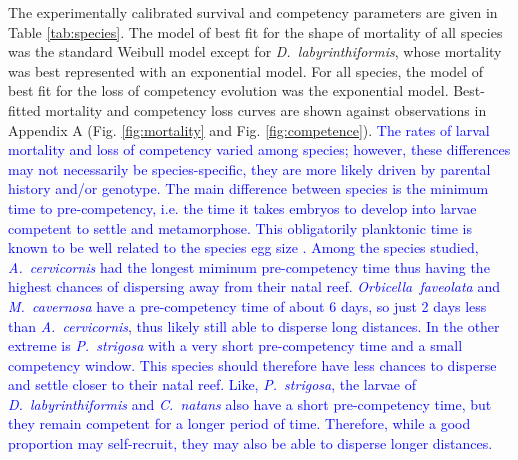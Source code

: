 \documentclass[preprint,12pt,authoryear]{elsarticle}
\newcommand{\modif}[1]{\textcolor{blue}{#1}}
\begin{document}
	The experimentally calibrated survival and competency parameters are given in Table \ref{tab:species}.  The model of best fit for the shape of mortality of all species was the standard Weibull model except for \textit{D.~labyrinthiformis}, whose mortality was best represented with an exponential model. For all species, the model of best fit for the loss of competency evolution was the exponential model. Best-fitted mortality and competency loss curves are shown against observations in Appendix A (Fig. \ref{fig:mortality} and Fig. \ref{fig:competence}). \modif{The rates of larval mortality and loss of competency varied among species; however, these differences may not necessarily be species-specific, they are more likely driven by parental history and/or genotype. The main difference between species is the minimum time to pre-competency, i.e. the time it takes embryos to develop into larvae competent to settle and metamorphose. This obligatorily planktonic time is known to be well related to the species egg size \citep{figueiredo2013synthesizing}. Among the species studied, \textit{A.~cervicornis} had the longest miminum pre-competency time thus having the highest chances of dispersing away from their natal reef. \textit{Orbicella~faveolata} and \textit{M.~cavernosa} have a pre-competency time of about 6 days, so just 2 days less than \textit{A.~cervicornis}, thus likely still able to disperse long distances. In the other extreme is \textit{P.~strigosa} with a very short pre-competency time and a small competency window. This species should therefore have less chances to disperse and settle closer to their natal reef. Like, \textit{P.~strigosa}, the larvae of \textit{D.~labyrinthiformis} and \textit{C.~natans} also have a short pre-competency time, but they remain competent for a longer period of time. Therefore, while a good proportion may self-recruit, they may also be able to disperse longer distances.}

	
	
	
\end{document}
